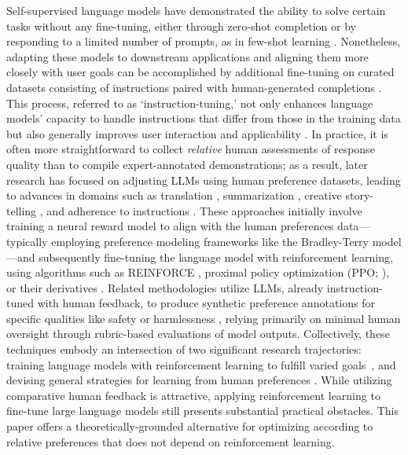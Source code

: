 Self-supervised language models have demonstrated the ability to solve certain tasks without any fine-tuning, either through zero-shot completion \citep{radford2019language} or by responding to a limited number of prompts, as in few-shot learning \citep{gpt3,megatron,chowdhery2022palm}. Nonetheless, adapting these models to downstream applications and aligning them more closely with user goals can be accomplished by additional fine-tuning on curated datasets consisting of instructions paired with human-generated completions \citep{mishra-etal-2022-cross,sanh2022multitask,chung2022scaling,thoppilan2022lamda}. This process, referred to as `instruction-tuning,’ not only enhances language models' capacity to handle instructions that differ from those in the training data but also generally improves user interaction and applicability \citep{chung2022scaling}. In practice, it is often more straightforward to collect \textit{relative} human assessments of response quality than to compile expert-annotated demonstrations; as a result, later research has focused on adjusting LLMs using human preference datasets, leading to advances in domains such as translation \citep{kreutzer-etal-2018-reliability}, summarization \citep{stiennon2022learning,ziegler2020finetuning}, creative story-telling \citep{ziegler2020finetuning}, and adherence to instructions \citep{ouyang2022training,ramamurthy2023is}. These approaches initially involve training a neural reward model to align with the human preferences data—typically employing preference modeling frameworks like the Bradley-Terry model \citep{bradley1952rankanalysis}—and subsequently fine-tuning the language model with reinforcement learning, using algorithms such as REINFORCE \citep{williams1992reinforce}, proximal policy optimization (PPO; \cite{schulman2017proximal}), or their derivatives \citep{ramamurthy2023is}. Related methodologies utilize LLMs, already instruction-tuned with human feedback, to produce synthetic preference annotations for specific qualities like safety or harmlessness \citep{bai2022constitutional}, relying primarily on minimal human oversight through rubric-based evaluations of model outputs. Collectively, these techniques embody an intersection of two significant research trajectories: training language models with reinforcement learning to fulfill varied goals~\citep{Ranzato2015SequenceLT,paulus2018a,wu2018learning}, and devising general strategies for learning from human preferences \citep{christiano2017deep,kupcsik2018learning}. While utilizing comparative human feedback is attractive, applying reinforcement learning to fine-tune large language models still presents substantial practical obstacles. This paper offers a theoretically-grounded alternative for optimizing according to relative preferences that does not depend on reinforcement learning.

